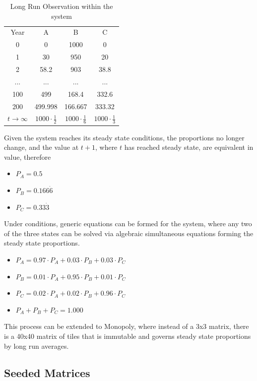 \documentclass[12pt]{article}
\begin{document}
\begin{table}[h]
\centering
\begin{tabular}{cccc}
Year & A       & B       & C       \\
0    & 0       & 1000    & 0       \\
1    & 30      & 950     & 20      \\
2    & 58.2    & 903     & 38.8    \\
...  & ...     & ...     & ...     \\
100  & 499     & 168.4   & 332.6   \\
200  & 499.998 & 166.667 & 333.32  \\
$t\to\infty$    & $1000\cdot\frac{1}{2}$     & $1000\cdot\frac{1}{6}$  & $1000\cdot\frac{1}{3}$
\end{tabular}
\caption{Long Run Observation within the system}
\end{table} 
Given the system reaches its steady state conditions, the proportions no longer change, and the value at $t+1$, where $t$ has reached steady state, are equivalent in value, therefore

\begin{itemize}
\item $P_A = 0.5$
\item $P_B = 0.166\dot{6}$
\item $P_C = 0.33\dot{3}$
\end{itemize}

Under conditions, generic equations can be formed for the system, where any two of the three states can be solved via algebraic simultaneous equations forming the steady state proportions.

\begin{itemize}
\item $P_A = 0.97 \cdot P_A + 0.03 \cdot P_B + 0.03 \cdot P_C$
\item $P_B = 0.01 \cdot P_A + 0.95 \cdot P_B + 0.01 \cdot P_C$
\item $P_C = 0.02 \cdot P_A + 0.02 \cdot P_B + 0.96 \cdot P_C$
\item $P_A+P_B+P_C=1.000$
\end{itemize}
This process can be extended to Monopoly, where instead of a 3x3 matrix, there is a 40x40 matrix of tiles that is immutable and governs steady state proportions by long run averages.

\subsection{Seeded Matrices}
\end{document}
